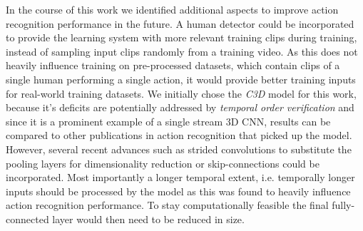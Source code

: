 In the course of this work we identified additional aspects to improve action recognition performance in the future.
A human detector could be incorporated to provide the learning system with more relevant training clips during training, instead of sampling input clips randomly from a training video.
As this does not heavily influence training on pre-processed datasets, which contain clips of a single human performing a single action, it would provide better training inputs for real-world training datasets.
We initially chose the \textit{C3D} model for this work, because it's deficits are potentially addressed by \textit{temporal order verification} and since it is a prominent example of a single stream 3D CNN, results can be compared to other publications in action recognition that picked up the model.
However, several recent advances such as strided convolutions to substitute the pooling layers for dimensionality reduction or skip-connections could be incorporated.
Most importantly a longer temporal extent, i.e. temporally longer inputs should be processed by the model as this was found to heavily influence action recognition performance.
To stay computationally feasible the final fully-connected layer would then need to be reduced in size.
